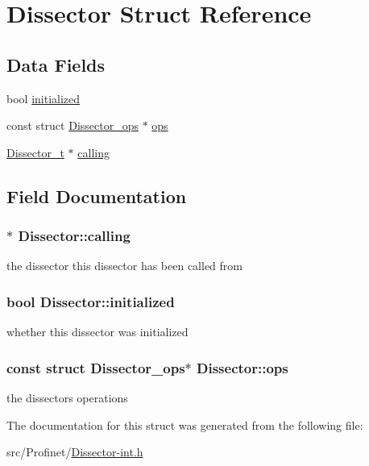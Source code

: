 \hypertarget{struct_dissector}{}\section{Dissector Struct Reference}
\label{struct_dissector}
\subsection*{Data Fields}
\begin{DoxyCompactItemize}
\item 
bool \hyperlink{struct_dissector_a86386b01b6edc229f64d438929d92a4f}{initialized}
\item 
const struct \hyperlink{struct_dissector__ops}{Dissector\+\_\+ops} $\ast$ \hyperlink{struct_dissector_a2786b3015a49f746ecbbc33840838a4e}{ops}
\item 
\hyperlink{struct_dissector}{Dissector\+\_\+t} $\ast$ \hyperlink{struct_dissector_a9c793579ef8c1fa11c26a0d146bc2f2c}{calling}
\end{DoxyCompactItemize}


\subsection{Field Documentation}
\hypertarget{struct_dissector_a9c793579ef8c1fa11c26a0d146bc2f2c}{}
\subsubsection[{calling}]{$\ast$ Dissector\+::calling}\label{struct_dissector_a9c793579ef8c1fa11c26a0d146bc2f2c}
the dissector this dissector has been called from \hypertarget{struct_dissector_a86386b01b6edc229f64d438929d92a4f}{}
\subsubsection[{initialized}]{\setlength{\rightskip}{0pt plus 5cm}bool Dissector\+::initialized}\label{struct_dissector_a86386b01b6edc229f64d438929d92a4f}
whether this dissector was initialized \hypertarget{struct_dissector_a2786b3015a49f746ecbbc33840838a4e}{}
\subsubsection[{ops}]{\setlength{\rightskip}{0pt plus 5cm}const struct {\bf Dissector\+\_\+ops}$\ast$ Dissector\+::ops}\label{struct_dissector_a2786b3015a49f746ecbbc33840838a4e}
the dissectors operations 

The documentation for this struct was generated from the following file\+:\begin{DoxyCompactItemize}
\item 
src/\+Profinet/\hyperlink{_dissector-int_8h}{Dissector-\/int.\+h}\end{DoxyCompactItemize}
